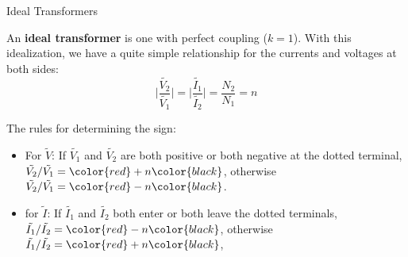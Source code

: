\documentclass{beamer}
\begin{document}
\begin{frame}{Ideal Transformers}

An \textbf{ideal transformer} is one with perfect coupling ($k=1$). With this idealization, we have a quite simple relationship for the currents and voltages at both sides:
$$\vert \frac{\tilde{V_2}}{\tilde{V_1}} \vert = \vert \frac{\tilde{I_1}}{\tilde{I_2}} \vert = \frac{N_2}{N_1} = n $$

The rules for determining the sign:
\begin{itemize}
    \item For $\tilde{V}$: If $\tilde{V_1}$ and $\tilde{V_2}$ are both positive or both negative at the dotted terminal, $\tilde{V_2} / \tilde{V_1} = \color{red}+n\color{black}$, otherwise  $\tilde{V_2} / \tilde{V_1} = \color{red}-n\color{black}$.
    \item for $\tilde{I}$: If $\tilde{I_1}$ and $\tilde{I_2}$ both enter or both leave the dotted terminals, $\tilde{I_1}/\tilde{I_2} = \color{red}-n\color{black}$, otherwise $\tilde{I_1}/\tilde{I_2} = \color{red}+n\color{black}$,
\end{itemize}


\end{frame}

\end{document}
